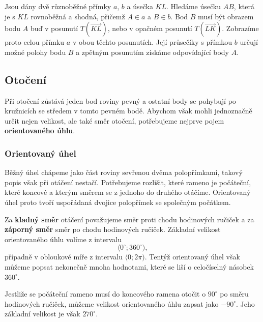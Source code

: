 \documentclass[12pt,a4paper]{article}
\begin{document}
\begin{examplebox}
    Jsou dány dvě různoběžné přímky $a$, $b$ a úsečka $KL$. Hledáme úsečku $AB$, která je s $KL$ rovnoběžná a shodná, přičemž $A\in a$ a $B\in b$. Bod $B$ musí být obrazem bodu $A$ buď v posunutí $T(\overrightarrow{KL})$, nebo v opačném posunutí $T(\overrightarrow{LK})$. Zobrazíme proto celou přímku $a$ v obou těchto posunutích. Její průsečíky s přímkou $b$ určují možné polohy bodu $B$ a zpětným posunutím získáme odpovídající body $A$.
\end{examplebox}


\subsection{Otočení}

Při otočení zůstává jeden bod roviny pevný a ostatní body se pohybují po kružnicích se středem v tomto pevném bodě. Abychom však mohli jednoznačně určit nejen velikost, ale také směr otočení, potřebujeme nejprve pojem \textbf{orientovaného úhlu}.

\subsubsection*{Orientovaný úhel}

Běžný úhel chápeme jako část roviny sevřenou dvěma polopřímkami, takový popis však při otáčení nestačí. Potřebujeme rozlišit, které rameno je počáteční, které koncové a kterým směrem se z jednoho do druhého otáčíme. Orientovaný úhel proto tvoří uspořádaná dvojice polopřímek se společným počátkem.

Za \textbf{kladný směr} otáčení považujeme směr proti chodu hodinových ručiček a za \textbf{záporný směr} směr po chodu hodinových ručiček. Základní velikost orientovaného úhlu volíme z intervalu
\[
    \langle 0^\circ;360^\circ),
\]
případně v obloukové míře z intervalu $\langle0;2\pi)$. Tentýž orientovaný úhel však můžeme popsat nekonečně mnoha hodnotami, které se liší o celočíselný násobek $360^\circ$.

\begin{examplebox}
    Jestliže se počáteční rameno musí do koncového ramena otočit o $90^\circ$ po směru hodinových ručiček, můžeme velikost orientovaného úhlu zapsat jako $-90^\circ$. Jeho základní velikost je však $270^\circ$.
\end{examplebox}
\end{document}
